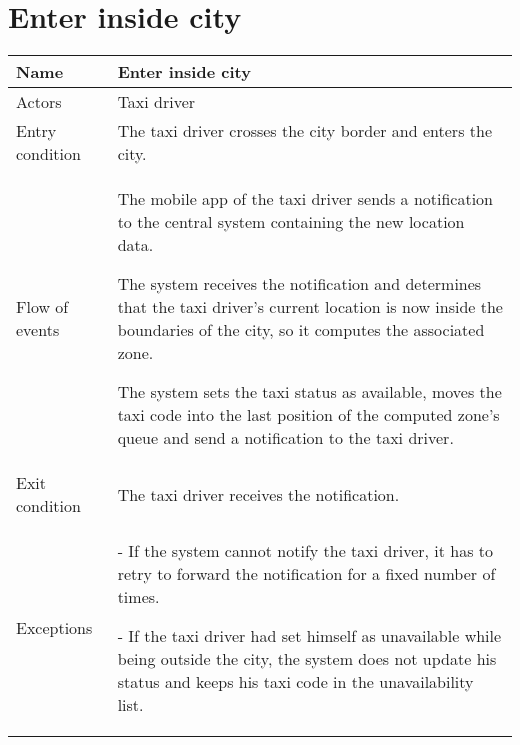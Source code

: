 \section{Enter inside city}
\begin{center}
\begin{longtable}{|l| p{9cm}|}
\hline
Name &
Enter inside city \\
\hline
Actors &
Taxi driver \\
\hline
Entry condition & 
The taxi driver crosses the city border and enters the city. \\
\hline
Flow of events & 
The mobile app of the taxi driver sends a notification to the central system containing the new location data. 

The system receives the notification and determines that the taxi driver's current location is now inside the boundaries of the city, so it computes the associated zone.

The system sets the taxi status as available, moves the taxi code into the last position of the computed zone’s queue and send a notification to the taxi driver. \\
\hline
Exit condition &
The taxi driver receives the notification. \\
\hline
Exceptions &
- If the system cannot notify the taxi driver, it has to retry to forward the notification for a fixed number of times.

- If the taxi driver had set himself as unavailable while being outside the city, the system does not update his status and keeps his taxi code in the unavailability list.\\
\hline
\end{longtable}
\end{center}